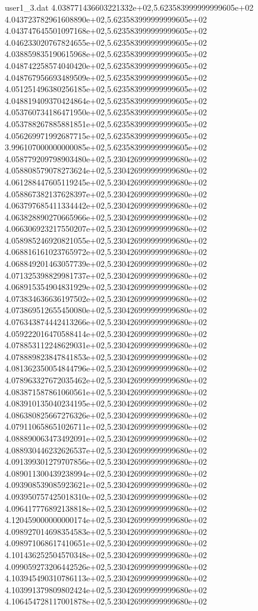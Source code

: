 \begin{filecontents}{user1_3.dat}
4.038771436603221332e+02,5.623583999999999605e+02
4.043723782961608890e+02,5.623583999999999605e+02
4.043747645501097168e+02,5.623583999999999605e+02
4.046233020767824655e+02,5.623583999999999605e+02
4.038859835190615968e+02,5.623583999999999605e+02
4.048742258574040420e+02,5.623583999999999605e+02
4.048767956693489509e+02,5.623583999999999605e+02
4.051251496380256185e+02,5.623583999999999605e+02
4.048819409370424864e+02,5.623583999999999605e+02
4.053760734186471950e+02,5.623583999999999605e+02
4.053788267885881851e+02,5.623583999999999605e+02
4.056269971992687715e+02,5.623583999999999605e+02
3.996107000000000085e+02,5.623583999999999605e+02
4.058779209798903480e+02,5.230426999999999680e+02
4.058808579078273624e+02,5.230426999999999680e+02
4.061288447605119245e+02,5.230426999999999680e+02
4.058867382137628397e+02,5.230426999999999680e+02
4.063797685411334442e+02,5.230426999999999680e+02
4.063828890270665966e+02,5.230426999999999680e+02
4.066306923217550207e+02,5.230426999999999680e+02
4.058985246920821055e+02,5.230426999999999680e+02
4.068816161023765972e+02,5.230426999999999680e+02
4.068849201463057739e+02,5.230426999999999680e+02
4.071325398829981737e+02,5.230426999999999680e+02
4.068915354904831929e+02,5.230426999999999680e+02
4.073834636636197502e+02,5.230426999999999680e+02
4.073869512655450080e+02,5.230426999999999680e+02
4.076343874442413266e+02,5.230426999999999680e+02
4.059222016470588414e+02,5.230426999999999680e+02
4.078853112248629031e+02,5.230426999999999680e+02
4.078889823847841853e+02,5.230426999999999680e+02
4.081362350054844796e+02,5.230426999999999680e+02
4.078963327672035462e+02,5.230426999999999680e+02
4.083871587861060561e+02,5.230426999999999680e+02
4.083910135040234195e+02,5.230426999999999680e+02
4.086380825667276326e+02,5.230426999999999680e+02
4.079110658651026711e+02,5.230426999999999680e+02
4.088890063473492091e+02,5.230426999999999680e+02
4.088930446232626537e+02,5.230426999999999680e+02
4.091399301279707856e+02,5.230426999999999680e+02
4.089011300439238994e+02,5.230426999999999680e+02
4.093908539085923621e+02,5.230426999999999680e+02
4.093950757425018310e+02,5.230426999999999680e+02
4.096417776892138818e+02,5.230426999999999680e+02
4.120459000000000174e+02,5.230426999999999680e+02
4.098927014698354583e+02,5.230426999999999680e+02
4.098971068617410651e+02,5.230426999999999680e+02
4.101436252504570348e+02,5.230426999999999680e+02
4.099059273206442526e+02,5.230426999999999680e+02
4.103945490310786113e+02,5.230426999999999680e+02
4.103991379809802424e+02,5.230426999999999680e+02
4.106454728117001878e+02,5.230426999999999680e+02

\end{filecontents}
